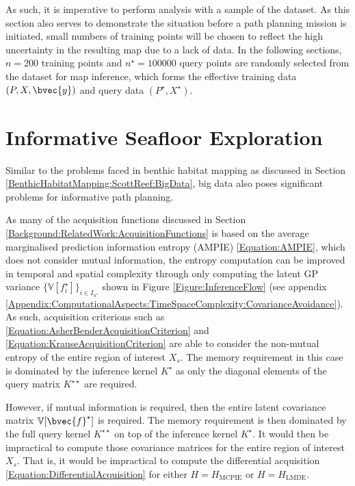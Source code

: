 			As such, it is imperative to perform analysis with a sample of the dataset. As this section also serves to demonstrate the situation before a path planning mission is initiated, small numbers of training points will be chosen to reflect the high uncertainty in the resulting map due to a lack of data. In the following sections, $n = 200$ training points and $n^{\star} = 100000$ query points are randomly selected from the dataset for map inference, which forms the effective training data $(P, X, \bvec{y})$ and query data $(P^{\star}, X^{\star})$.
			
		\section{Informative Seafloor Exploration}
		\label{Appendix:BigData:InformativeSeafloorExploration}
		
			Similar to the problems faced in benthic habitat mapping as discussed in Section \ref{BenthicHabitatMapping:ScottReef:BigData}, big data also poses significant problems for informative path planning.
			
			As many of the acquisition functions discussed in Section \ref{Background:RelatedWork:AcquisitionFunctions} is based on the average marginalised prediction information entropy (AMPIE) \eqref{Equation:AMPIE}, which does not consider mutual information, the entropy computation can be improved in temporal and spatial complexity through only computing the latent GP variance $\{\mathbb{V}[f^{\star}_{i}]\}_{i \in I_{n^{\star}}}$ shown in Figure \ref{Figure:InferenceFlow} (see appendix \ref{Appendix:ComputationalAspects:TimeSpaceComplexity:CovarianceAvoidance}). As such, acquisition criterions such as \eqref{Equation:AsherBenderAcquisitionCriterion} and \eqref{Equation:KrauseAcquisitionCriterion} are able to consider the non-mutual entropy of the entire region of interest $X_{s}$. The memory requirement in this case is dominated by the inference kernel $K^{\star}$ as only the diagonal elements of the query matrix $K^{\star \star}$ are required. 
			
			However, if mutual information is required, then the entire latent covariance matrix $\mathbb{V}[\bvec{f}^{\star}]$ is required. The memory requirement is then dominated by the full query kernel $K^{\star \star}$ on top of the inference kernel $K^{\star}$. It would then be impractical to compute those covariance matrices for the entire region of interest $X_{s}$. That is, it would be impractical to compute the differential acquisition \eqref{Equation:DifferentialAcquisition} for either $H = H_{\mathrm{MCPIE}}$ or $H = H_{\mathrm{LMDE}}$.
			
